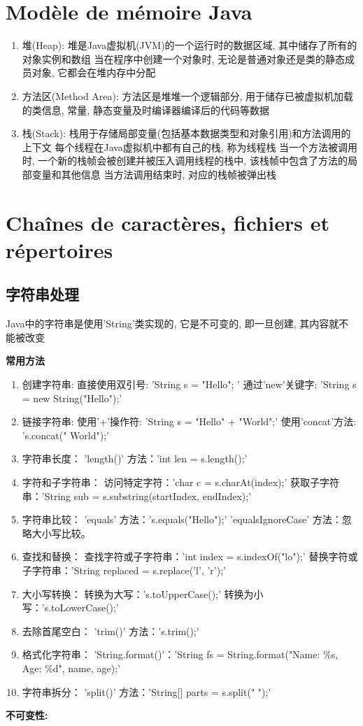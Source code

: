 \documentclass{article}
\begin{document}
\section{Modèle de mémoire Java}
\begin{enumerate}
    \item 堆(Heap):
    \subitem 堆是Java虚拟机(JVM)的一个运行时的数据区域, 其中储存了所有的对象实例和数组
    \subitem 当在程序中创建一个对象时, 无论是普通对象还是类的静态成员对象, 它都会在堆内存中分配
    \item 方法区(Method Area):
    \subitem 方法区是堆堆一个逻辑部分, 用于储存已被虚拟机加载的类信息, 常量, 静态变量及时编译器编译后的代码等数据
    \item 栈(Stack):
    \subitem 栈用于存储局部变量(包括基本数据类型和对象引用)和方法调用的上下文
    \subitem 每个线程在Java虚拟机中都有自己的栈, 称为线程栈
    \subitem 当一个方法被调用时, 一个新的栈帧会被创建并被压入调用线程的栈中, 该栈帧中包含了方法的局部变量和其他信息
    \subitem 当方法调用结束时, 对应的栈帧被弹出栈
\end{enumerate}
\section{ Chaînes de caractères, fichiers et répertoires}
\subsection{字符串处理}
Java中的字符串是使用'String'类实现的, 它是不可变的, 即一旦创建, 其内容就不能被改变

\textbf{常用方法}
\begin{enumerate}
    \item 创建字符串:
    \subitem 直接使用双引号: 'String s = "Hello"; '
    \subitem 通过'new'关键字: 'String s = new String("Hello");'
    \item 链接字符串:
    \subitem 使用'+'操作符: 'String s = "Hello" + "World";'
    \subitem 使用'concat'方法: 's.concat(" World");'
    \item 字符串长度：
    \subitem 'length()' 方法：'int len = s.length();'
    \item 字符和子字符串：
    \subitem 访问特定字符：'char c = s.charAt(index);'
    \subitem 获取子字符串：'String sub = s.substring(startIndex, endIndex);'
    \item 字符串比较：
    \subitem 'equals' 方法：'s.equals("Hello");'
    \subitem 'equalsIgnoreCase' 方法：忽略大小写比较。
    \item 查找和替换：
    \subitem 查找字符或子字符串：'int index = s.indexOf("lo");'
    \subitem 替换字符或子字符串：'String replaced = s.replace('l', 'r');'
    \item 大小写转换：
    \subitem 转换为大写：'s.toUpperCase();'
    \subitem 转换为小写：'s.toLowerCase();'
    \item 去除首尾空白：
    \subitem 'trim()' 方法：'s.trim();'
    \item 格式化字符串：
    \subitem 'String.format()'：'String fs = String.format("Name: \%s, Age: \%d", name, age);'
    \item 字符串拆分：
    \subitem 'split()' 方法：'String[] parts = s.split(" ");'
\end{enumerate}
\textbf{不可变性:}
\end{document}

